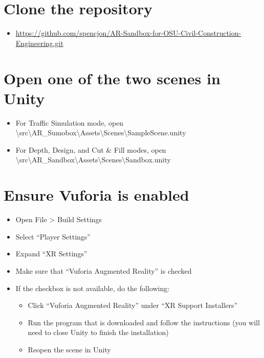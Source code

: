 \documentclass{article}
\begin{document}
\section{Clone the repository}
    \begin{itemize}
        \item  \url{https://github.com/spencjon/AR-Sandbox-for-OSU-Civil-Construction-Engineering.git}
    \end{itemize}

\section{Open one of the two scenes in Unity}
\begin{itemize}
    \item For Traffic Simulation mode, open \textbackslash src\textbackslash AR\_Sumobox\textbackslash Assets\textbackslash Scenes\textbackslash SampleScene.unity
    \item For Depth, Design, and Cut \& Fill modes, open \textbackslash src\textbackslash AR\_Sandbox\textbackslash Assets\textbackslash Scenes\textbackslash Sandbox.unity
\end{itemize}

\section{Ensure Vuforia is enabled}
\begin{itemize}
    \item Open File > Build Settings
    \item Select “Player Settings”
    \item Expand “XR Settings”
    \item Make sure that “Vuforia Augmented Reality” is checked
    \item If the checkbox is not available, do the following:
        \begin{itemize}
            \item Click “Vuforia Augmented Reality” under “XR Support Installers”
            \item Run the program that is downloaded and follow the instructions (you will need to close Unity to finish the installation)
            \item Reopen the scene in Unity
        \end{itemize}
\end{itemize}
\end{document}
